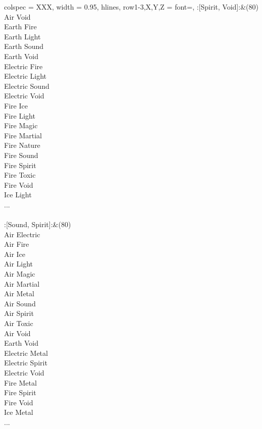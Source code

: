 \begin{longtblr}[
	caption = {2v2 Attacking Effective},
	label = {2v2-Attacking-Effective},
]{
	colspec = {XXX}, width = 0.95\linewidth,
	hlines,
	row{1-3,X,Y,Z} = {font=\bfseries},
}
	:[Spirit, Void]:&{(80)\\
	Air Void \\
	Earth Fire \\
	Earth Light \\
	Earth Sound \\
	Earth Void \\
	Electric Fire \\
	Electric Light \\
	Electric Sound \\
	Electric Void \\
	Fire Ice \\
	Fire Light \\
	Fire Magic \\
	Fire Martial \\
	Fire Nature \\
	Fire Sound \\
	Fire Spirit \\
	Fire Toxic \\
	Fire Void \\
	Ice Light \\
	...\\
	}\\

	:[Sound, Spirit]:&{(80)\\
	Air Electric \\
	Air Fire \\
	Air Ice \\
	Air Light \\
	Air Magic \\
	Air Martial \\
	Air Metal \\
	Air Sound \\
	Air Spirit \\
	Air Toxic \\
	Air Void \\
	Earth Void \\
	Electric Metal \\
	Electric Spirit \\
	Electric Void \\
	Fire Metal \\
	Fire Spirit \\
	Fire Void \\
	Ice Metal \\
	...\\
	}\\


\end{longtblr}
